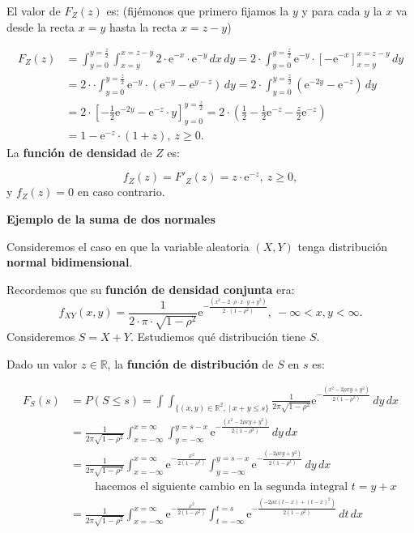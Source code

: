 \documentclass[]{book}
\begin{document}
El valor de \(F_Z(z)\) es: (fijémonos que primero fijamos la \(y\) y para cada \(y\) la \(x\) va desde la recta \(x=y\) hasta la recta \(x=z-y\))

\[
\begin{array}{rl}
F_Z(z) & =\displaystyle\int_{y=0}^{y=\frac{z}{2}}\int_{x=y}^{x=z-y}2 \cdot\mathrm{e}^{-x}\cdot\mathrm{e}^{-y}\, dx\, dy = 2 \cdot\int_{y=0}^{y=\frac{z}{2}} \mathrm{e}^{-y} \cdot\left[-\mathrm{e}^{-x}\right]_{x=y}^{x=z-y}\, dy \\ & 
\displaystyle = 2 \cdot\cdot\int_{y=0}^{y=\frac{z}{2}} \mathrm{e}^{-y}\cdot \left(\mathrm{e}^{-y}-\mathrm{e}^{y-z}\right)\, dy = 2 \cdot\int_{y=0}^{y=\frac{z}{2}} \left(\mathrm{e}^{-2y}-\mathrm{e}^{-z} \right)\, dy  \\
& = 2\cdot\left[-\frac{1}{2}\mathrm{e}^{-2y}-\mathrm{e}^{-z} \cdot y\right]_{y=0}^{y=\frac{z}{2}}  = \displaystyle 2\cdot\left(\frac{1}{2}-\frac{1}{2}\mathrm{e}^{-z}-\frac{z}{2}\mathrm{e}^{-z}\right) \\ 
& = 1-\mathrm{e}^{-z}\cdot(1+z),\ z\geq 0.
\end{array}
\]
La \textbf{función de densidad} de \(Z\) es:

\[
f_Z(z)=F'_Z(z)=z\cdot\mathrm{e}^{-z},\ z\geq 0,
\]
y \(f_Z(z)=0\) en caso contrario.

\textbf{Ejemplo de la suma de dos normales}

Consideremos el caso en que la variable aleatoria \((X,Y)\) tenga distribución \textbf{normal bidimensional}.

Recordemos que su \textbf{función de densidad conjunta} era:
\[
f_{XY}(x,y)=\frac{1}{2\cdot \pi\cdot \sqrt{1-\rho^2}}\mathrm{e}^{-\frac{(x^2-2\cdot \rho\cdot  x\cdot y+y^2)}{2\cdot (1-\rho^2)}},\ -\infty <x,y<\infty.
\]
Consideremos \(S=X+Y\). Estudiemos qué distribución tiene \(S\).

Dado un valor \(z\in\mathbb{R}\), la \textbf{función de distribución} de \(S\) en \(s\) es:

\[
\begin{array}{rl}
F_S(s) & =P(S\leq s)=\displaystyle \int\int_{\{(x,y)\in\mathbb{R}^2,\ |\ x+y\leq s\}}\frac{1}{2\pi\sqrt{1-\rho^2}}\mathrm{e}^{-\frac{(x^2-2\rho xy+y^2)}{2(1-\rho^2)}}\, dy\, dx \\
& =\displaystyle  \frac{1}{2\pi\sqrt{1-\rho^2}} \int_{x=-\infty}^{x=\infty}\int_{y=-\infty}^{y=s-x}\mathrm{e}^{-\frac{(x^2-2\rho xy+y^2)}{2(1-\rho^2)}}\, dy\, dx \\
& = \displaystyle  \frac{1}{2\pi\sqrt{1-\rho^2}} \int_{x=-\infty}^{x=\infty} \mathrm{e}^{-\frac{x^2}{2(1-\rho^2)}} \int_{y=-\infty}^{y=s-x}\mathrm{e}^{-\frac{(-2\rho xy+y^2)}{2(1-\rho^2)}}\, dy\, dx  \\ &\ \qquad\mbox{hacemos el siguiente cambio  en la segunda integral $t=y+x$}\\
& = \displaystyle  \frac{1}{2\pi\sqrt{1-\rho^2}} \int_{x=-\infty}^{x=\infty} \mathrm{e}^{-\frac{x^2}{2(1-\rho^2)}} \int_{t=-\infty}^{t=s}\mathrm{e}^{-\frac{(-2\rho x(t-x)+(t-x)^2)}{2(1-\rho^2)}}\, dt\, dx 
\end{array}
\]
\end{document}
